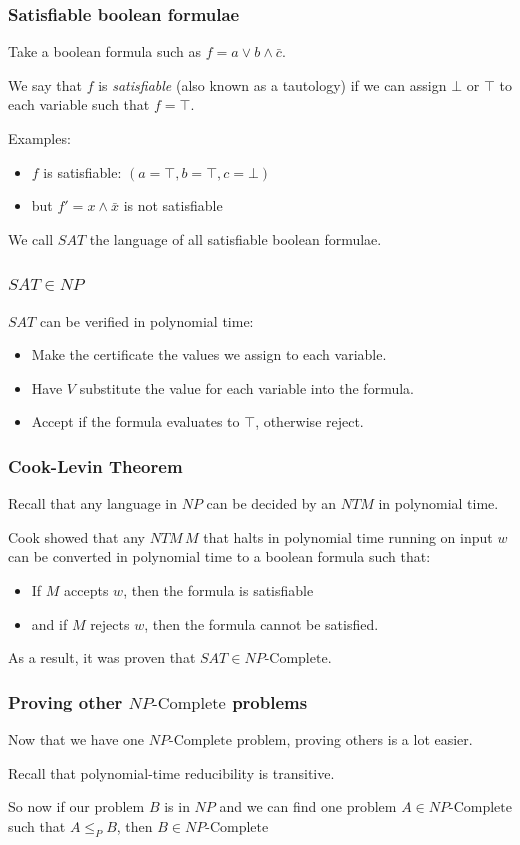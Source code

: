\documentclass[aspectratio=169]{beamer}
\begin{document}
\begin{frame}
\frametitle{Satisfiable boolean formulae}
Take a boolean formula such as $f = a \vee b \wedge \bar{c}$.

We say that $f$ is {\em satisfiable} (also known as a tautology) if we can assign $\bot$ or $\top$ to each variable such that $f = \top$.

Examples:
\begin{itemize}
    \item $f$ is satisfiable: $(a = \top, b = \top, c =  \bot)$
    \item but $f' = x \wedge \bar{x}$ is not satisfiable
\end{itemize}

We call $SAT$ the language of all satisfiable boolean formulae.
\end{frame}

\begin{frame}
\frametitle{$SAT \in NP$}
$SAT$ can be verified in polynomial time:

\begin{itemize}
    \item<1-> Make the certificate the values we assign to each variable.
    \item<2-> Have $V$ substitute the value for each variable into the formula.
    \item<3-> Accept if the formula evaluates to $\top$, otherwise reject.
\end{itemize}
\end{frame}

\begin{frame}
\frametitle{Cook-Levin Theorem}
Recall that any language in $NP$ can be decided by an $NTM$ in polynomial time.

Cook showed that any $NTM\, M$ that halts in polynomial time running on input $w$ can be converted in polynomial time to a boolean formula such that:

\begin{itemize}
    \item If $M$ accepts $w$, then the formula is satisfiable
    \item and if $M$ rejects $w$, then the formula cannot be satisfied.
\end{itemize}

As a result, it was proven that $SAT \in NP\text{-Complete}$.
\end{frame}

\begin{frame}
\frametitle{Proving other $NP\text{-Complete}$ problems}

Now that we have one $NP\text{-Complete}$ problem, proving others is a lot easier.

Recall that polynomial-time reducibility is transitive.

So now if our problem $B$ is in $NP$ and we can find one problem $A \in NP\text{-Complete}$ such that $A \leq_P B$, then $B \in NP\text{-Complete}$
\end{frame}
\end{document}
